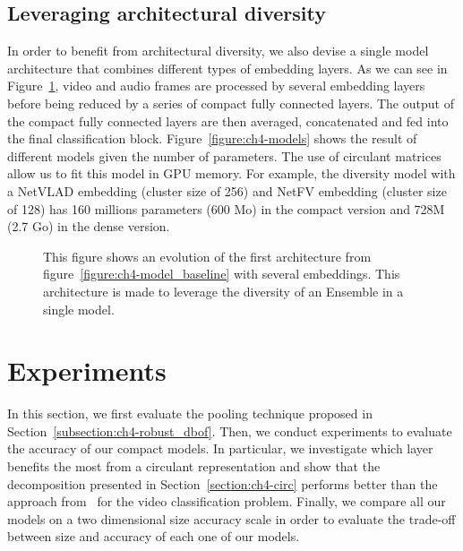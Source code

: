\subsection{Leveraging architectural diversity}
\label{subsection:ch4-ensemble}

In order to benefit from architectural diversity, we also devise a single model architecture that combines different types of embedding layers.
As we can see in Figure~\ref{figure:ch4-diverstiy_architecture}, video and audio frames are processed by several embedding layers before being reduced by a series of compact fully connected layers.
The output of the compact fully connected layers are then averaged, concatenated and fed into the final classification block.
Figure~\ref{figure:ch4-models} shows the result of different models given the number of parameters.
The use of circulant matrices allow us to fit this model in GPU memory.
For example, the diversity model with a NetVLAD embedding (cluster size of 256) and NetFV embedding (cluster size of 128) has 160 millions parameters (600 Mo) in the compact version and 728M (2.7 Go) in the dense version. 

\begin{figure}[htb]
  \centering
  
  \caption{This figure shows an evolution of the first architecture from figure~\ref{figure:ch4-model_baseline} with several embeddings. This architecture is made to leverage the diversity of an Ensemble in a single model.}
  \label{figure:ch4-diverstiy_architecture}
\end{figure}

\section{Experiments}
\label{section:ch4-xp}

In this section, we first evaluate the pooling technique proposed in Section~\ref{subsection:ch4-robust_dbof}.
Then, we conduct experiments to evaluate the accuracy of our compact models.
In particular, we investigate which layer benefits the most from a circulant representation and show that the decomposition presented in Section~\ref{section:ch4-circ} performs better than the  approach from~\cite{cheng} for the video classification problem.
Finally, we compare all our models on a two dimensional size \vs accuracy scale in order to evaluate the trade-off between size and accuracy of each one of our models. 


